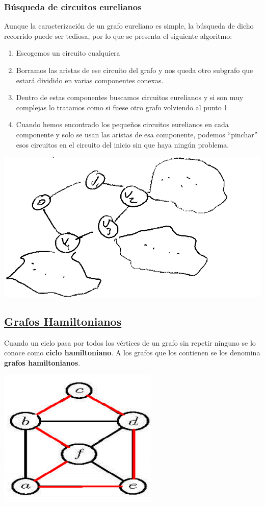 \documentclass[10pt,a4paper,openright]{book}
\begin{document}
\subsubsection*{Búsqueda de circuitos eurelianos}
Aunque la caracterización de un grafo eureliano es simple, la búsqueda de dicho recorrido puede ser tediosa, por lo que se presenta el siguiente algoritmo:
\begin{enumerate}
\item Escogemos un circuito cualquiera
\item Borramos las aristas de ese circuito del grafo y nos queda otro subgrafo que estará dividido en varias componentes conexas.
\item Dentro de estas componentes buscamos circuitos eurelianos y si son muy complejas lo tratamos como si fuese otro grafo volviendo al punto 1
\item Cuando hemos encontrado los pequeños circuitos eurelianos en cada componente y solo se usan las aristas de esa componente, podemos ``pinchar'' esos circuitos en el circuito del inicio sin que haya ningún problema.
\end{enumerate}
\begin{center}
\includegraphics[scale=0.65]{algoritmo de euler}
\end{center}

\subsection*{\underline{Grafos Hamiltonianos}}
Cuando un ciclo pasa por todos los vértices de un grafo sin repetir ninguno se lo conoce como \textbf{ciclo hamiltoniano}. A los grafos que los contienen se los denomina \textbf{grafos hamiltonianos}.
\begin{center}
\includegraphics[scale=0.75]{grafo hamiltoniano}
\end{center}
\end{document}
